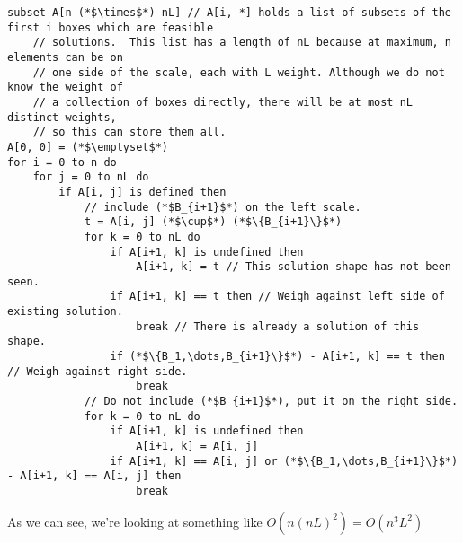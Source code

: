 \documentclass{article}
\begin{document}
    \begin{lstlisting}
subset A[n (*$\times$*) nL] // A[i, *] holds a list of subsets of the first i boxes which are feasible
    // solutions.  This list has a length of nL because at maximum, n elements can be on
    // one side of the scale, each with L weight. Although we do not know the weight of 
    // a collection of boxes directly, there will be at most nL distinct weights,
    // so this can store them all.
A[0, 0] = (*$\emptyset$*)
for i = 0 to n do
    for j = 0 to nL do
        if A[i, j] is defined then
            // include (*$B_{i+1}$*) on the left scale.
            t = A[i, j] (*$\cup$*) (*$\{B_{i+1}\}$*)
            for k = 0 to nL do
                if A[i+1, k] is undefined then
                    A[i+1, k] = t // This solution shape has not been seen.
                if A[i+1, k] == t then // Weigh against left side of existing solution.
                    break // There is already a solution of this shape.
                if (*$\{B_1,\dots,B_{i+1}\}$*) - A[i+1, k] == t then // Weigh against right side.
                    break
            // Do not include (*$B_{i+1}$*), put it on the right side.
            for k = 0 to nL do
                if A[i+1, k] is undefined then
                    A[i+1, k] = A[i, j]
                if A[i+1, k] == A[i, j] or (*$\{B_1,\dots,B_{i+1}\}$*) - A[i+1, k] == A[i, j] then
                    break
    \end{lstlisting}
As we can see, we're looking at something like $O(n(nL)^2) = O(n^3L^2)$
\end{document}
